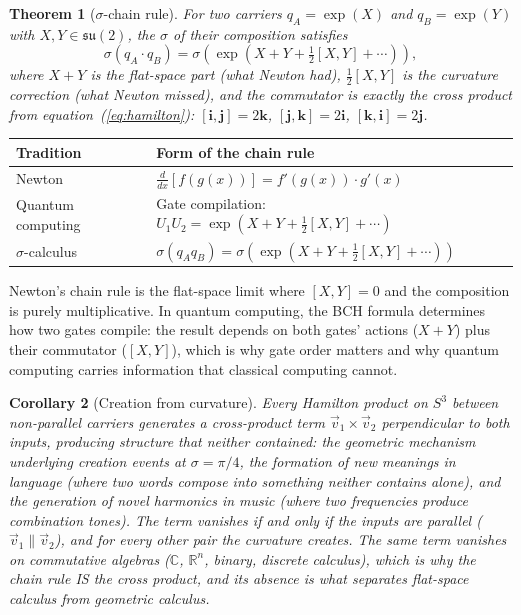 \documentclass[12pt]{article}
\newtheorem{theorem}{Theorem}[section]
\newtheorem{corollary}[theorem]{Corollary}
\begin{document}
\begin{theorem}[$\sigma$-chain rule]
    For two carriers $q_A = \exp(X)$ and $q_B = \exp(Y)$ with $X, Y \in \mathfrak{su}(2)$, the $\sigma$ of their composition satisfies
    \begin{equation}
        \sigma(q_A \cdot q_B) = \sigma\!\left(\exp\!\left(X + Y + \tfrac{1}{2}[X,Y] + \cdots\right)\right),
    \end{equation}
    where $X + Y$ is the flat-space part (what Newton had), $\frac{1}{2}[X,Y]$ is the curvature correction (what Newton missed), and the commutator is exactly the cross product from equation~(\ref{eq:hamilton}): $[\mathbf{i},\mathbf{j}] = 2\mathbf{k}$, $[\mathbf{j},\mathbf{k}] = 2\mathbf{i}$, $[\mathbf{k},\mathbf{i}] = 2\mathbf{j}$.
\end{theorem}

\begin{center}
\begin{tabular}{l l}
    \toprule
    Tradition & Form of the chain rule \\
    \midrule
    Newton & $\frac{d}{dx}[f(g(x))] = f'(g(x)) \cdot g'(x)$ \\[4pt]
    Quantum computing & Gate compilation: $U_1 U_2 = \exp(X + Y + \frac{1}{2}[X,Y] + \cdots)$ \\[4pt]
    $\sigma$-calculus & $\sigma(q_A q_B) = \sigma(\exp(X + Y + \frac{1}{2}[X,Y] + \cdots))$ \\
    \bottomrule
\end{tabular}
\end{center}

Newton's chain rule is the flat-space limit where $[X,Y] = 0$ and the composition is purely multiplicative. In quantum computing, the BCH formula determines how two gates compile: the result depends on both gates' actions ($X + Y$) plus their commutator ($[X,Y]$), which is why gate order matters and why quantum computing carries information that classical computing cannot.

\begin{corollary}[Creation from curvature]
    Every Hamilton product on $S^3$ between non-parallel carriers generates a cross-product term $\vec{v}_1 \times \vec{v}_2$ perpendicular to both inputs, producing structure that neither contained: the geometric mechanism underlying creation events at $\sigma = \pi/4$, the formation of new meanings in language (where two words compose into something neither contains alone), and the generation of novel harmonics in music (where two frequencies produce combination tones). The term vanishes if and only if the inputs are parallel ($\vec{v}_1 \| \vec{v}_2$), and for every other pair the curvature creates. The same term vanishes on commutative algebras ($\mathbb{C}$, $\mathbb{R}^n$, binary, discrete calculus), which is why the chain rule IS the cross product, and its absence is what separates flat-space calculus from geometric calculus.
\end{corollary}
\end{document}
